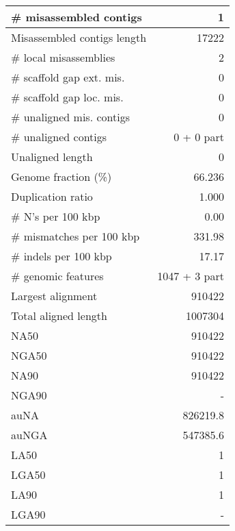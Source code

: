\documentclass[12pt,a4paper]{article}
\begin{document}
\begin{table}[ht]
\begin{center}
\begin{tabular}{|l*{1}{|r}|}
\# misassembled contigs & 1 \\ \hline
Misassembled contigs length & 17222 \\ \hline
\# local misassemblies & 2 \\ \hline
\# scaffold gap ext. mis. & 0 \\ \hline
\# scaffold gap loc. mis. & 0 \\ \hline
\# unaligned mis. contigs & 0 \\ \hline
\# unaligned contigs & 0 + 0 part \\ \hline
Unaligned length & 0 \\ \hline
Genome fraction (\%) & 66.236 \\ \hline
Duplication ratio & 1.000 \\ \hline
\# N's per 100 kbp & 0.00 \\ \hline
\# mismatches per 100 kbp & 331.98 \\ \hline
\# indels per 100 kbp & 17.17 \\ \hline
\# genomic features & 1047 + 3 part \\ \hline
Largest alignment & 910422 \\ \hline
Total aligned length & 1007304 \\ \hline
NA50 & 910422 \\ \hline
NGA50 & 910422 \\ \hline
NA90 & 910422 \\ \hline
NGA90 & - \\ \hline
auNA & 826219.8 \\ \hline
auNGA & 547385.6 \\ \hline
LA50 & 1 \\ \hline
LGA50 & 1 \\ \hline
LA90 & 1 \\ \hline
LGA90 & - \\ \hline
\end{tabular}
\end{center}
\end{table}
\end{document}
